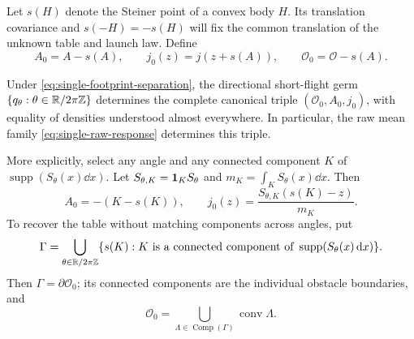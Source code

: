Let $s(H)$ denote the Steiner point of a convex body $H$.  Its
translation covariance and $s(-H)=-s(H)$ will fix the common
translation of the unknown table and launch law.  Define
\begin{equation}\label{eq:single-canonical-parameters}
 A_0=A-s(A),\qquad j_0(z)=j(z+s(A)),\qquad
                      \mathcal O_0=\mathcal O-s(A).
\end{equation}

\begin{theorem}
\label{thm:single-law-rigidity}
Under \eqref{eq:single-footprint-separation}, the directional
short-flight germ $\{q_\theta:\theta\in\mathbb R/2\pi\mathbb Z\}$ determines
the complete canonical triple $(\mathcal O_0,A_0,j_0)$, with equality
of densities understood almost everywhere.  In particular, the raw
mean family \eqref{eq:single-raw-response} determines this triple.

More explicitly, select any angle and any connected component $K$
of $\operatorname{supp}(S_\theta(x)\dd x)$.  Let
$S_{\theta,K}=\mathbf 1_KS_\theta$ and
$m_K=\int_KS_\theta(x)\dd x$.  Then
\begin{equation}\label{eq:single-density-recovery}
 A_0=-(K-s(K)),\qquad
 j_0(z)=\frac{S_{\theta,K}(s(K)-z)}{m_K}.
\end{equation}
To recover the table without matching components across angles, put
\begin{equation}\label{eq:single-boundary-recovery}
 \Gamma=\bigcup_{\theta\in\mathbb R/2\pi\mathbb Z}
       \{s(K):K\text{ is a connected component of }
                        \operatorname{supp}(S_\theta(x)\,\mathrm d x)\}.
\end{equation}
Then $\Gamma=\partial\mathcal O_0$; its connected components are
the individual obstacle boundaries, and
\begin{equation}\label{eq:single-table-recovery}
 \mathcal O_0=\bigcup_{\Lambda\in\operatorname{Comp}(\Gamma)}
                                      \operatorname{conv}\Lambda.
\end{equation}
\end{theorem}
